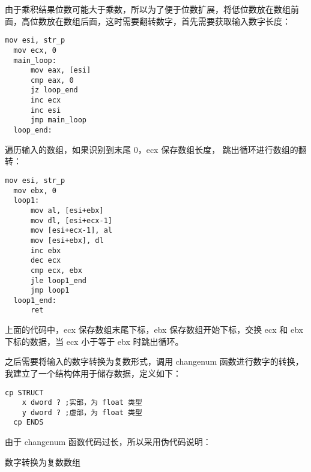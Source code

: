 \documentclass[proposal-report]{bitart}
\begin{document}
由于乘积结果位数可能大于乘数，所以为了便于位数扩展，将低位数放在数组前面，高位数放在数组后面，这时需要翻转数字，首先需要获取输入数字长度：

\begin{lstlisting}[language={[x86masm]Assembler}]
  mov esi, str_p
  mov ecx, 0
  main_loop:
      mov eax, [esi]
      cmp eax, 0
      jz loop_end
      inc ecx
      inc esi
      jmp main_loop
  loop_end:
\end{lstlisting}

遍历输入的数组，如果识别到末尾 0，ecx 保存数组长度， 跳出循环进行数组的翻转：

\begin{lstlisting}[language={[x86masm]Assembler}]
  mov esi, str_p
  mov ebx, 0
  loop1:
      mov al, [esi+ebx]
      mov dl, [esi+ecx-1]
      mov [esi+ecx-1], al
      mov [esi+ebx], dl
      inc ebx
      dec ecx
      cmp ecx, ebx
      jle loop1_end
      jmp loop1
  loop1_end:
      ret
\end{lstlisting}

上面的代码中，ecx 保存数组末尾下标，ebx 保存数组开始下标，交换 ecx 和 ebx 下标的数据，当 ecx 小于等于 ebx 时跳出循环。

之后需要将输入的数字转换为复数形式，调用 changenum 函数进行数字的转换，我建立了一个结构体用于储存数据，定义如下：

\begin{lstlisting}[language={[x86masm]Assembler}]
  cp STRUCT
    x dword ? ;实部，为 float 类型
    y dword ? ;虚部，为 float 类型
  cp ENDS
\end{lstlisting}

由于 changenum 函数代码过长，所以采用伪代码说明：

\makeatletter
\def\BState{\State\hskip-\ALG@thistlm}
\makeatother
\begin{algorithm}[htb]
  \caption{数字转换为复数数组}
\end{algorithm}
\end{document}
